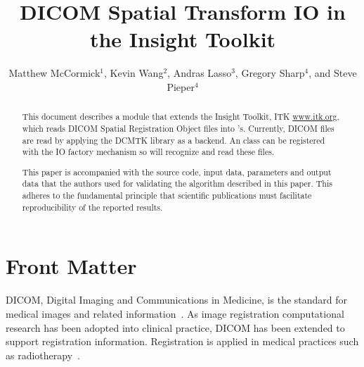 \documentclass{InsightArticle}
\title{DICOM Spatial Transform IO in the Insight Toolkit}
\author{Matthew McCormick$^{1}$,
        Kevin Wang$^{2}$,
        Andras Lasso$^{3}$,
        Gregory Sharp$^{4}$,
        and Steve Pieper$^{4}$}
\newcommand{\IJhandlerIDnumber}{3468}
\begin{document}
%
%
\IJhandlefooter{\IJhandlerIDnumber}


\ifpdf
\else
\fi


\maketitle


\ifhtml
\chapter*{Front Matter\label{front}}
\fi


\begin{abstract}
\noindent
This document describes a module that extends the Insight Toolkit,
ITK \url{www.itk.org}, which reads DICOM Spatial Registration Object files into
's. Currently, DICOM files are read by applying the DCMTK
library as a backend. An  class can be registered
with the IO factory mechanism so  will recognize
and read these files.

This paper is accompanied with the source code, input data, parameters and
output data that the authors used for validating the algorithm described in
this paper. This adheres to the fundamental principle that scientific
publications must facilitate reproducibility of the reported results.

\end{abstract}

\IJhandlenote{\IJhandlerIDnumber}

\tableofcontents

DICOM, Digital Imaging and Communications in Medicine, is the standard for
medical images and related information~\cite{DICOMStandard}. As image registration
computational research has been adopted into clinical practice,
DICOM has been extended to support registration information. Registration
is applied in medical practices such as radiotherapy~\cite{Pinter2012b}.
\end{document}
